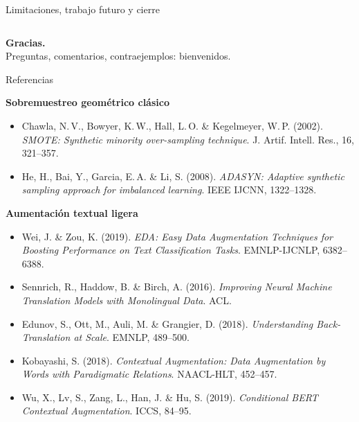 \begin{frame}{Limitaciones, trabajo futuro y cierre}
\begin{columns}[T]
\end{columns}

\vspace{0.6em}
\begin{center}
\begin{tcolorbox}[colback=uaibluedark, colframe=uaibluedark, coltext=white,
                  width=0.85\linewidth, halign=center, arc=4pt]
\textbf{Gracias.}\\[0.2em]
{\small Preguntas, comentarios, contraejemplos: bienvenidos.}
\end{tcolorbox}
\end{center}
\end{frame}

\begin{frame}[allowframebreaks]{Referencias}
\scriptsize
\setlength{\parskip}{0.25em}

\textbf{Sobremuestreo geométrico clásico}
\begin{itemize}\setlength\itemsep{0pt}
  \item Chawla, N.\,V., Bowyer, K.\,W., Hall, L.\,O. \& Kegelmeyer, W.\,P. (2002). \textit{SMOTE: Synthetic minority over-sampling technique}. J. Artif. Intell. Res., 16, 321--357.
  \item He, H., Bai, Y., Garcia, E.\,A. \& Li, S. (2008). \textit{ADASYN: Adaptive synthetic sampling approach for imbalanced learning}. IEEE IJCNN, 1322--1328.
\end{itemize}

\textbf{Aumentación textual ligera}
\begin{itemize}\setlength\itemsep{0pt}
  \item Wei, J. \& Zou, K. (2019). \textit{EDA: Easy Data Augmentation Techniques for Boosting Performance on Text Classification Tasks}. EMNLP-IJCNLP, 6382--6388.
  \item Sennrich, R., Haddow, B. \& Birch, A. (2016). \textit{Improving Neural Machine Translation Models with Monolingual Data}. ACL.
  \item Edunov, S., Ott, M., Auli, M. \& Grangier, D. (2018). \textit{Understanding Back-Translation at Scale}. EMNLP, 489--500.
  \item Kobayashi, S. (2018). \textit{Contextual Augmentation: Data Augmentation by Words with Paradigmatic Relations}. NAACL-HLT, 452--457.
  \item Wu, X., Lv, S., Zang, L., Han, J. \& Hu, S. (2019). \textit{Conditional BERT Contextual Augmentation}. ICCS, 84--95.
\end{itemize}


\end{frame}
